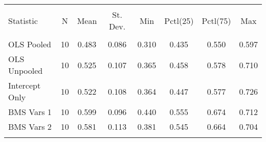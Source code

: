
\begin{table}[!htbp] \centering 
  \caption{} 
  \label{} 
\begin{tabular}{@{\extracolsep{5pt}}lccccccc} 
\\[-1.8ex]\hline 
\hline \\[-1.8ex] 
Statistic & \multicolumn{1}{c}{N} & \multicolumn{1}{c}{Mean} & \multicolumn{1}{c}{St. Dev.} & \multicolumn{1}{c}{Min} & \multicolumn{1}{c}{Pctl(25)} & \multicolumn{1}{c}{Pctl(75)} & \multicolumn{1}{c}{Max} \\ 
\hline \\[-1.8ex] 
OLS Pooled & 10 & 0.483 & 0.086 & 0.310 & 0.435 & 0.550 & 0.597 \\ 
OLS Unpooled & 10 & 0.525 & 0.107 & 0.365 & 0.458 & 0.578 & 0.710 \\ 
Intercept Only & 10 & 0.522 & 0.108 & 0.364 & 0.447 & 0.577 & 0.726 \\ 
BMS Vars 1 & 10 & 0.599 & 0.096 & 0.440 & 0.555 & 0.674 & 0.712 \\ 
BMS Vars 2 & 10 & 0.581 & 0.113 & 0.381 & 0.545 & 0.664 & 0.704 \\ 
\hline \\[-1.8ex] 
\end{tabular} 
\end{table} 
